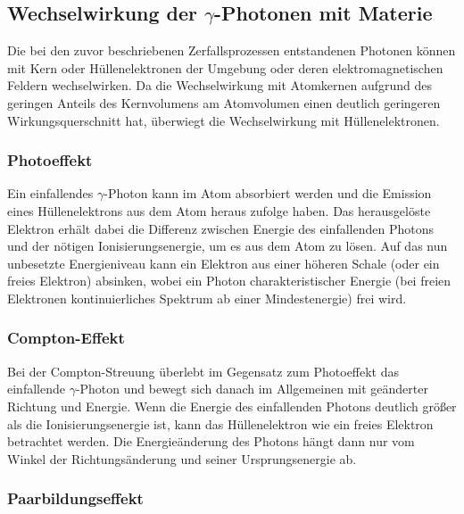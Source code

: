 \documentclass[
	a4paper,
	12pt,
	pagesize,
	ngerman
]{scrartcl}
\begin{document}
	\subsection{Wechselwirkung der $\gamma$-Photonen mit Materie}

	Die bei den zuvor beschriebenen Zerfallsprozessen entstandenen Photonen können mit Kern oder Hüllenelektronen der Umgebung oder deren elektromagnetischen Feldern wechselwirken.
	Da die Wechselwirkung mit Atomkernen aufgrund des geringen Anteils des Kernvolumens am Atomvolumen einen deutlich geringeren Wirkungsquerschnitt hat, überwiegt die Wechselwirkung mit Hüllenelektronen.

	\subsubsection{Photoeffekt}
	Ein einfallendes $\gamma$-Photon kann im Atom absorbiert werden und die Emission eines Hüllenelektrons aus dem Atom heraus zufolge haben.
	Das herausgelöste Elektron erhält dabei die Differenz zwischen Energie des einfallenden Photons und der nötigen Ionisierungsenergie, um es aus dem Atom zu lösen.
	Auf das nun unbesetzte Energieniveau kann ein Elektron aus einer höheren Schale (oder ein freies Elektron) absinken, wobei ein Photon charakteristischer Energie (bei freien Elektronen kontinuierliches Spektrum ab einer Mindestenergie) frei wird. %

	\subsubsection{Compton-Effekt}
	Bei der Compton-Streuung überlebt im Gegensatz zum Photoeffekt das einfallende $\gamma$-Photon und bewegt sich danach im Allgemeinen mit geänderter Richtung und Energie. %
	Wenn die Energie des einfallenden Photons deutlich größer als die Ionisierungsenergie ist, kann das Hüllenelektron wie ein freies Elektron betrachtet werden.
	Die Energieänderung des Photons hängt dann nur vom Winkel der Richtungsänderung und seiner Ursprungsenergie ab.

	\subsubsection{Paarbildungseffekt}
\end{document}
